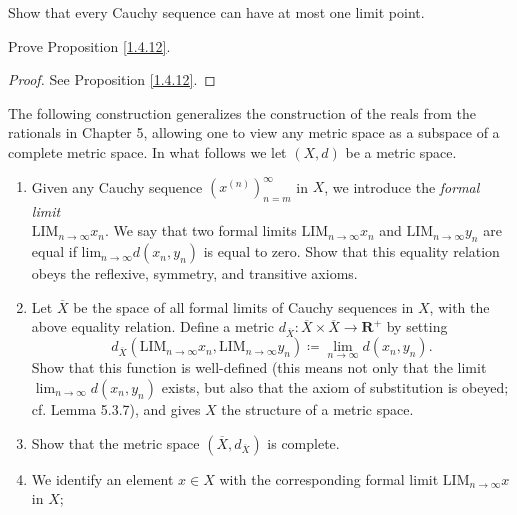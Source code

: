 \begin{exercise}\label{ex 1.4.6}
    Show that every Cauchy sequence can have at most one limit point.
\end{exercise}

\begin{exercise}\label{ex 1.4.7}
    Prove Proposition \ref{1.4.12}.
\end{exercise}

\begin{proof}
    See Proposition \ref{1.4.12}.
\end{proof}

\begin{exercise}\label{ex 1.4.8}
    The following construction generalizes the construction of the reals from the rationals in Chapter 5, allowing one to view any metric space as a subspace of a complete metric space.
    In what follows we let \((X, d)\) be a metric space.
    \begin{enumerate}
        \item Given any Cauchy sequence \((x^{(n)})_{n = m}^\infty\) in \(X\), we introduce the \emph{formal limit} \\
              \(\text{LIM}_{n \to \infty} x_n\).
              We say that two formal limits \(\text{LIM}_{n \to \infty} x_n\) and \(\text{LIM}_{n \to \infty} y_n\) are equal if \(\text{lim}_{n \to \infty} d(x_n, y_n)\) is equal to zero.
              Show that this equality relation obeys the reflexive, symmetry, and transitive axioms.
        \item Let \(\overline{X}\) be the space of all formal limits of Cauchy sequences in \(X\), with the above equality relation.
              Define a metric \(d_{\overline{X}} : \overline{X} \times \overline{X} \to \mathbf{R}^+\) by setting
              \[
                  d_{\overline{X}}(\text{LIM}_{n \to \infty} x_n, \text{LIM}_{n \to \infty} y_n) \coloneqq \lim_{n \to \infty} d(x_n, y_n).
              \]
              Show that this function is well-defined (this means not only that the limit \\
              \(\lim_{n \to \infty} d(x_n, y_n)\) exists, but also that the axiom of substitution is obeyed;
              cf. Lemma 5.3.7), and gives \(X\) the structure of a metric space.
        \item Show that the metric space \((\overline{X}, d_{\overline{X}})\) is complete.
        \item We identify an element \(x \in X\) with the corresponding formal limit \(\text{LIM}_{n \to \infty} x\) in \(X\);

\end{enumerate}
\end{exercise}
